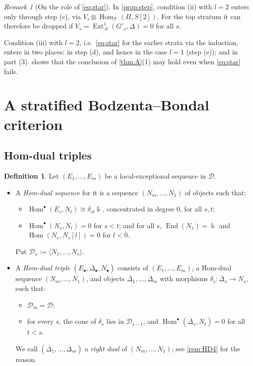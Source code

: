 \documentclass[11pt,reqno]{amsart}
\theoremstyle{plain}
\theoremstyle{definition}
\newtheorem{definition}[theorem]{Definition}
\theoremstyle{remark}
\newtheorem{remark}[theorem]{Remark}
\newcommand{\kk}{\Bbbk}
\DeclareMathOperator{\Hom}{Hom}
\DeclareMathOperator{\End}{End}
\DeclareMathOperator{\Ext}{Ext}
\newcommand{\thick}[1]{\langle #1\rangle}
\newcommand{\Deltabar}{\overline{\Delta}}
\newcommand{\cD}{\mathcal{D}}
\newcommand{\cA}{\mathcal{A}}
\newcommand{\cT}{\mathcal{T}}
\begin{document}
\begin{remark}[On the role of \eqref{eq:star}]\label{rem:star}
In \cref{prop:step}, condition (ii) with $l=2$ enters only through step (c), via $V_s\otimes\Hom_\cT(\Pi,S[2])$. For the top stratum it can therefore be dropped if $V_s=\Ext^1_\cA(G'_s,\Delta)=0$ for all $s$.

Condition (iii) with $l=2$, i.e.\ \eqref{eq:star} for the earlier strata via the induction, enters in two places: in step (d), and hence in the case $l=1$ (step (e)); and in part (3).  shows that the conclusion of \cref{thm:A}(1) may hold even when \eqref{eq:star} fails.
\end{remark}

\section{A stratified Bodzenta--Bondal criterion}\label{sec:criterion}

\subsection{Hom-dual triples}

\begin{definition}\label{def:hom-dual}
Let $(E_1,\dots,E_m)$ be a local-exceptional sequence in $\cD$.
\begin{itemize}
\item A \emph{Hom-dual sequence} for it is a sequence $(N_m,\dots,N_1)$ of objects such that:
\begin{itemize}
\item[\textup{(HD1)}] $\Hom^\bullet(E_s,N_t)\cong\delta_{st}\kk$, concentrated in degree $0$, for all $s,t$;
\item[\textup{(HD2)}] $\Hom^\bullet(N_s,N_t)=0$ for $s<t$; and for all $s$, $\End(N_s)=\kk$ and $\Hom(N_s,N_s[l])=0$ for $l<0$.
\end{itemize}
Put $\cD_s:=\thick{N_1,\dots,N_s}$.
\item A \emph{Hom-dual triple} $(E_\bullet,\Deltabar_\bullet,N_\bullet)$ consists of $(E_1,\dots,E_m)$, a Hom-dual sequence $(N_m,\dots,N_1)$, and objects $\Deltabar_1,\dots,\Deltabar_m$ with morphisms $\delta_s\colon\Deltabar_s\to N_s$, such that:
\begin{itemize}
\item[\textup{(HD3)}] $\cD_m=\cD$;
\item[\textup{(HD4)}] for every $s$, the cone of $\delta_s$ lies in $\cD_{s-1}$, and $\Hom^\bullet(\Deltabar_s,N_t)=0$ for all $t<s$.
\end{itemize}
We call $(\Deltabar_1,\dots,\Deltabar_m)$ a \emph{right dual} of $(N_m,\dots,N_1)$; see \cref{rem:HD4} for the reason.
\end{itemize}
\end{definition}
\end{document}
